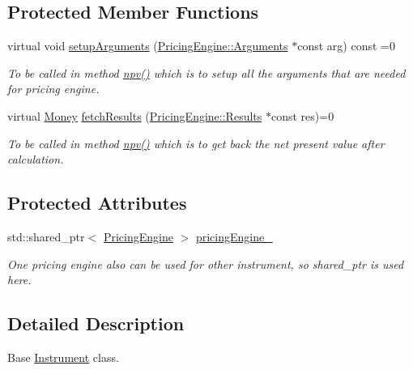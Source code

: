 \subsection*{Protected Member Functions}
\begin{DoxyCompactItemize}
\item 
virtual void \hyperlink{class_instrument_a5cd384be384fe415f09ecc78e2a87539}{setup\+Arguments} (\hyperlink{class_pricing_engine_1_1_arguments}{Pricing\+Engine\+::\+Arguments} $\ast$const arg) const =0
\begin{DoxyCompactList}\small\item\em To be called in method \hyperlink{class_instrument_aa750f2ae95a21d65a073da3171e8d084}{npv()} which is to setup all the arguments that are needed for pricing engine. \end{DoxyCompactList}\item 
virtual \hyperlink{_name_def_8h_a5a9d48c16a694e9a2d9f1eca730dc8c5}{Money} \hyperlink{class_instrument_a381f093402f789ad7c0ffecd233167dc}{fetch\+Results} (\hyperlink{class_pricing_engine_1_1_results}{Pricing\+Engine\+::\+Results} $\ast$const res)=0
\begin{DoxyCompactList}\small\item\em To be called in method \hyperlink{class_instrument_aa750f2ae95a21d65a073da3171e8d084}{npv()} which is to get back the net present value after calculation. \end{DoxyCompactList}\end{DoxyCompactItemize}
\subsection*{Protected Attributes}
\begin{DoxyCompactItemize}
\item 
std\+::shared\+\_\+ptr$<$ \hyperlink{class_pricing_engine}{Pricing\+Engine} $>$ \hyperlink{class_instrument_a6fdd5548ccc944536ff73913d98bf598}{pricing\+Engine\+\_\+}
\begin{DoxyCompactList}\small\item\em One pricing engine also can be used for other instrument, so shared\+\_\+ptr is used here. \end{DoxyCompactList}\end{DoxyCompactItemize}


\subsection{Detailed Description}
Base \hyperlink{class_instrument}{Instrument} class. 

